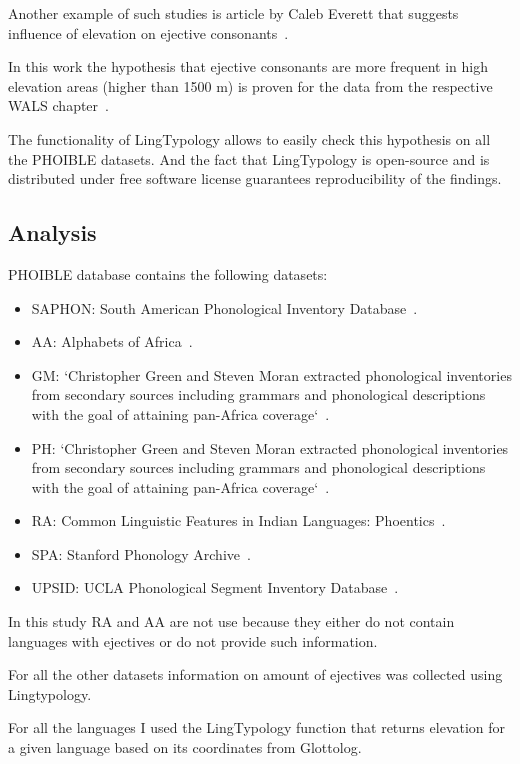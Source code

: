 \documentclass[a4paper,12pt]{article}
\begin{document}
Another example of such studies is article by Caleb Everett that suggests influence of elevation on ejective consonants~\parencite{ejectives}.

In this work the hypothesis that ejective consonants are more frequent in high elevation areas (higher than 1500 m) is proven for the data from the respective WALS chapter~\parencite{wals7}.

The functionality of LingTypology allows to easily check this hypothesis on all the PHOIBLE datasets. And the fact that LingTypology is open-source and is distributed under free software license guarantees reproducibility of the findings.

\subsection{Analysis}

PHOIBLE database contains the following datasets:
\begin{itemize}
 \item SAPHON: South American Phonological Inventory Database~\parencite{saphon}.
 \item AA: Alphabets of Africa~\parencite{aa}.
 \item GM: `Christopher Green and Steven Moran extracted phonological inventories from secondary sources including grammars and phonological descriptions with the goal of attaining pan-Africa coverage`~\parencite{gm}.
 \item PH: `Christopher Green and Steven Moran extracted phonological inventories from secondary sources including grammars and phonological descriptions with the goal of attaining pan-Africa coverage`~\parencite{gm}.
 \item RA: Common Linguistic Features in Indian Languages: Phoentics~\parencite{ra}.
 \item SPA: Stanford Phonology Archive~\parencite{spa}.
 \item UPSID: UCLA Phonological Segment Inventory Database~\parencite{upsid}.
\end{itemize}

In this study RA and AA are not use because they either do not contain languages with ejectives or do not provide such information.

For all the other datasets information on amount of ejectives was collected using Lingtypology.

For all the languages I used the LingTypology function that returns elevation for a given language based on its coordinates from Glottolog.
\end{document}
